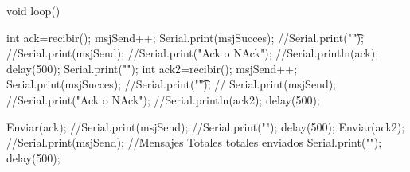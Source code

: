 \documentclass[journal,trans]{IEEEtran}
\begin{document}
\begin{itemize}
{  
  }




void loop() {
 
   
  int ack=recibir();
  msjSend++;
  Serial.print(msjSucces);
//Serial.print("\t");
  //Serial.print(msjSend); 
  //Serial.print("Ack o NAck");
    //Serial.println(ack);
          delay(500);
              Serial.print("\n");
  int ack2=recibir();
  msjSend++;
  Serial.print(msjSucces);
//Serial.print("\t");
 // Serial.print(msjSend); 
  //Serial.print("Ack o NAck");
    //Serial.println(ack2);
          delay(500);
          
          Enviar(ack);
  //Serial.print(msjSend); 
    //Serial.print("\n");
          delay(500);
          Enviar(ack2);
//Serial.print(msjSend); //Mensajes Totales totales enviados
    Serial.print("\n");
          delay(500);

  
    
}


\end{itemize}
\end{document}
